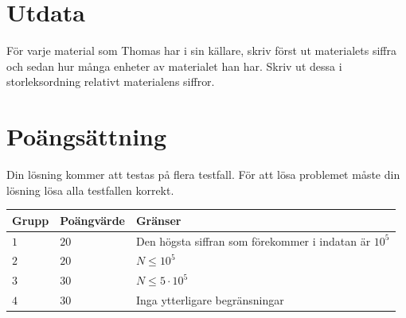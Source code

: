 \section*{Utdata}
För varje material som Thomas har i sin källare, skriv först ut materialets siffra och sedan hur många enheter av materialet han har.
Skriv ut dessa i storleksordning relativt materialens siffror.

\section*{Poängsättning}
Din lösning kommer att testas på flera testfall.
\noindent
För att lösa problemet måste din lösning lösa alla testfallen korrekt.

\noindent
\begin{tabular}{| l | l | l |}
\hline
  Grupp & Poängvärde & Gränser \\ \hline
  $1$    & $20$       &  Den högsta siffran som förekommer i indatan är $10^5$ \\ \hline
  $2$    & $20$       &  $N \leq 10^5$ \\ \hline
  $3$    & $30$       &  $N \leq 5 \cdot 10^5$ \\ \hline
  $4$    & $30$       &  Inga ytterligare begränsningar \\ \hline
\end{tabular}
